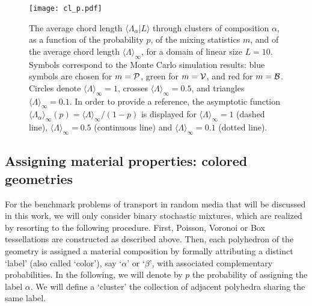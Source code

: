 \documentclass[final,authoryear,5p,times,twocolumn]{elsarticle}
\begin{document}
\begin{figure}[t]
\begin{center}
\texttt{[image: cl\_p.pdf]}
\end{center}
\caption{The average chord length $\langle \Lambda_\alpha | L\rangle$ through clusters of composition $\alpha$, as a function of the probability $p$, of the mixing statistics $m$, and of the average chord length ${\langle \Lambda \rangle}_{\infty}$, for a domain of linear size $L=10$. Symbols correspond to the Monte Carlo simulation results: blue symbols are chosen for $m={\cal P}$, green for $m={\cal V}$, and red for $m={\cal B}$. Circles denote ${\langle \Lambda \rangle}_{\infty}=1$, crosses ${\langle \Lambda \rangle}_{\infty}=0.5$, and triangles ${\langle \Lambda \rangle}_{\infty}=0.1$. In order to provide a reference, the asymptotic function ${\langle \Lambda_{\alpha} \rangle}_{\infty}(p)={\langle \Lambda \rangle}_{\infty}/(1-p)$ is displayed for ${\langle \Lambda \rangle}_{\infty}=1$ (dashed line), ${\langle \Lambda \rangle}_{\infty}=0.5$ (continuous line) and ${\langle \Lambda \rangle}_{\infty}=0.1$ (dotted line).}
\label{cl_p}
\end{figure}

\subsection{Assigning material properties: colored geometries}

For the benchmark problems of transport in random media that will be discussed in this work, we will only consider binary stochastic mixtures, which are realized by resorting to the following procedure. First, Poisson, Voronoi or Box tessellations are constructed as described above. Then, each polyhedron of the geometry is assigned a material composition by formally attributing a distinct `label' (also called `color'), say `$\alpha$' or `$\beta$', with associated complementary probabilities. In the following, we will denote by $p$ the probability of assigning the label $\alpha$. We will define a `cluster' the collection of adjacent polyhedra sharing the same label.
\end{document}
